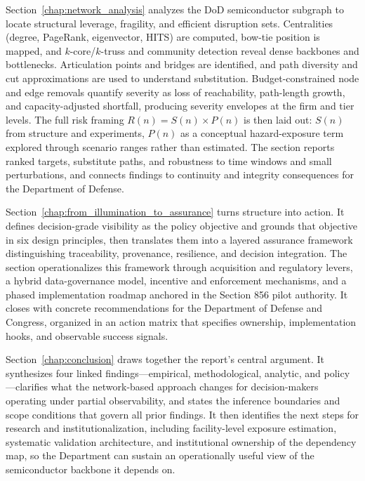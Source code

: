 Section~\ref{chap:network_analysis} analyzes the DoD semiconductor subgraph to locate structural leverage, fragility, and efficient disruption sets. Centralities (degree, PageRank, eigenvector, HITS) are computed, bow-tie position is mapped, and \(k\)-core/\(k\)-truss and community detection reveal dense backbones and bottlenecks. Articulation points and bridges are identified, and path diversity and cut approximations are used to understand substitution. Budget-constrained node and edge removals quantify severity as loss of reachability, path-length growth, and capacity-adjusted shortfall, producing severity envelopes at the firm and tier levels. The full risk framing \(R(n)=S(n)\times P(n)\) is then laid out: \(S(n)\) from structure and experiments, \(P(n)\) as a conceptual hazard-exposure term explored through scenario ranges rather than estimated. The section reports ranked targets, substitute paths, and robustness to time windows and small perturbations, and connects findings to continuity and integrity consequences for the Department of Defense.

Section~\ref{chap:from_illumination_to_assurance} turns structure into action. It defines decision-grade visibility as the policy objective and grounds that objective in six design principles, then translates them into a layered assurance framework distinguishing traceability, provenance, resilience, and decision integration. The section operationalizes this framework through acquisition and regulatory levers, a hybrid data-governance model, incentive and enforcement mechanisms, and a phased implementation roadmap anchored in the Section 856 pilot authority. It closes with concrete recommendations for the Department of Defense and Congress, organized in an action matrix that specifies ownership, implementation hooks, and observable success signals.

Section~\ref{chap:conclusion} draws together the report's central argument. It synthesizes four linked findings---empirical, methodological, analytic, and policy---clarifies what the network-based approach changes for decision-makers operating under partial observability, and states the inference boundaries and scope conditions that govern all prior findings. It then identifies the next steps for research and institutionalization, including facility-level exposure estimation, systematic validation architecture, and institutional ownership of the dependency map, so the Department can sustain an operationally useful view of the semiconductor backbone it depends on.

